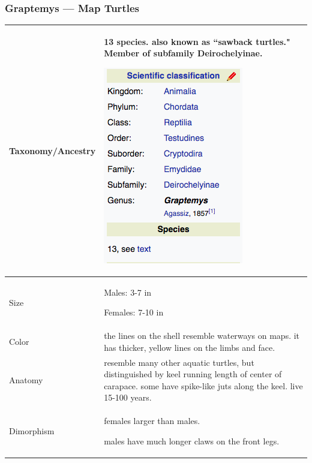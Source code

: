 \subsubsection{Graptemys --- Map Turtles}
\begin{center}
\begin{longtabu} to 

	\hline
	Taxonomy/Ancestry &
	13 species. also known as ``sawback turtles." Member of subfamily Deirochelyinae.
	
	\begin{center} \includegraphics[scale=0.5]{testudines/emydidae/graptemys/tax} \end{center}
	 \\
	\hline
	Size & 
	Males: 3-7 in
	
	Females: 7-10 in
	\\
	\hline
	Color &
	the lines on the shell resemble waterways on maps. it has thicker, yellow lines on the limbs and face.
	 \\
	\hline
	Anatomy &
	resemble many other aquatic turtles, but distinguished by keel running length of center of carapace. some have spike-like juts along the keel. live 15-100 years.
	 \\
	\hline
	Dimorphism & 
	females larger than males. 
	
	males have much longer claws on the front legs.
	

\end{longtabu}
\end{center}
